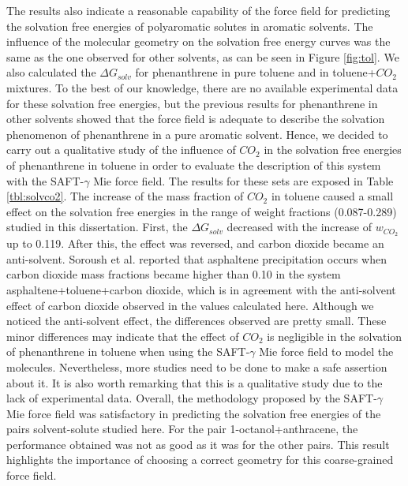 \documentclass[final,12p,times,twocolumn]{elsarticle}
\begin{document}
	The results also indicate a reasonable capability of the force field for predicting the solvation free energies of polyaromatic solutes in aromatic solvents. The influence of the molecular geometry on the solvation free energy curves was the same as the one observed for other solvents, as can be seen in Figure \ref{fig:tol}.  We also calculated the $\Delta G_{solv}$ for phenanthrene in pure toluene and in toluene+$CO_{2}$ mixtures. To the best of our knowledge, there are no available experimental data for these solvation free energies, but the previous results for phenanthrene in other solvents showed that the force field is adequate to describe the solvation phenomenon of phenanthrene in a pure aromatic solvent. Hence, we decided to carry out a qualitative study of the influence of $CO_{2}$ in the solvation free energies of phenanthrene in toluene in order to evaluate the description of this system with the SAFT-$\gamma$ Mie force field. The results for these sets are exposed in Table \ref{tbl:solvco2}. The increase of the mass fraction of $CO_{2}$ in toluene caused a small effect on the solvation free energies in the range of weight fractions (0.087-0.289) studied in this dissertation. First, the $\Delta G_{solv}$ decreased with the increase of $w_{CO_{2}}$ up to 0.119. After this, the effect was reversed, and carbon dioxide became an anti-solvent. Soroush et al. \cite{SOROUSH2014405} reported that asphaltene precipitation occurs when carbon dioxide mass fractions became higher than 0.10 in the system asphaltene+toluene+carbon dioxide, which is in agreement with the anti-solvent effect of carbon dioxide observed in the values calculated here. Although we noticed the anti-solvent effect, the differences observed are pretty small. These minor differences may indicate that the effect of $CO_{2}$ is negligible in the solvation of phenanthrene in toluene when using the SAFT-$\gamma$ Mie force field to model the molecules. Nevertheless, more studies need to be done to make a safe assertion about it. It is also worth remarking that this is a qualitative study due to the lack of experimental data. Overall, the methodology proposed by the SAFT-$\gamma$ Mie force field was satisfactory in predicting the solvation free energies of the pairs solvent-solute studied here. For the pair 1-octanol+anthracene, the performance obtained was not as good as it was for the other pairs. This result highlights the importance of choosing a correct geometry for this coarse-grained force field.    
	
\end{document}
